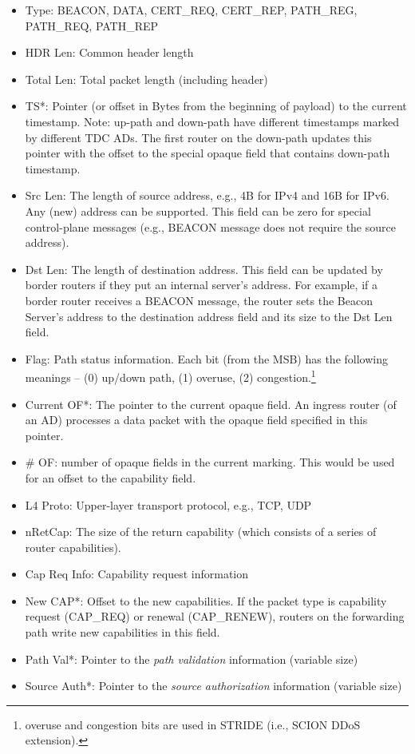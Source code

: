 \begin{itemize}
\item{Type: } BEACON, DATA, CERT\_REQ, CERT\_REP, PATH\_REG, PATH\_REQ, PATH\_REP
\item{HDR Len: } Common header length
\item{Total Len: } Total packet length (including header)
\item{TS*: } Pointer (or offset in Bytes from the beginning of payload) to the current timestamp. Note: up-path and down-path have different timestamps marked by different TDC ADs. The first router on the down-path updates this pointer with the offset to the special opaque field that contains down-path timestamp.
\item{Src Len: } The length of source address, e.g., 4B for IPv4 and 16B for IPv6. Any (new) address can be supported. This field can be zero for special control-plane messages (e.g., BEACON message does not require the source address). 
\item{Dst Len: } The length of destination address. This field can be updated by border routers if they put an internal server's address. For example, if a border router receives a BEACON message, the router sets the Beacon Server's address to the destination address field and its size to the Dst Len field. 
\item{Flag: } Path status information. Each bit (from the MSB) has the following meanings -- (0) up/down path, (1) overuse, (2) congestion.\footnote{overuse and congestion bits are used in STRIDE (i.e., SCION DDoS extension).} 
\item{Current OF*: } The pointer to the current opaque field. An ingress router (of an AD) processes a data packet with the opaque field specified in this pointer.
\item{\# OF: } number of opaque fields in the current marking. This would be used for an offset to the capability field.
\item{L4 Proto: }  Upper-layer transport protocol, e.g., TCP, UDP
\item{nRetCap: } The size of the return capability (which consists of a series of router capabilities). 
\item{Cap Req Info: } Capability request information
\item{New CAP*: } Offset to the new capabilities. If the packet type is capability request (CAP\_REQ) or renewal (CAP\_RENEW), routers on the forwarding path write new capabilities in this field.
\item{Path Val*: } Pointer to the {\em path validation} information (variable size)
\item{Source Auth*: } Pointer to the {\em source authorization} information (variable size)
\end{itemize}


